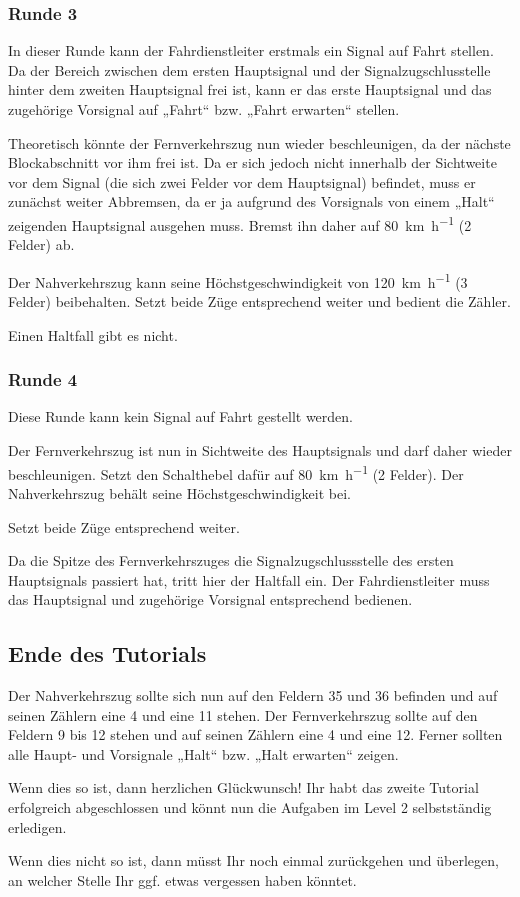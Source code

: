 \subsubsection*{Runde 3}
   In dieser Runde kann der Fahrdienstleiter erstmals ein Signal auf Fahrt stellen. Da der Bereich zwischen dem ersten Hauptsignal und der Signalzugschlusstelle hinter dem zweiten Hauptsignal frei ist, kann er das erste Hauptsignal und das zugehörige Vorsignal auf „Fahrt“ bzw. „Fahrt erwarten“ stellen.

   Theoretisch könnte der Fernverkehrszug nun wieder beschleunigen, da der nächste Blockabschnitt vor ihm frei ist. Da er sich jedoch nicht innerhalb der Sichtweite vor dem Signal (die sich zwei Felder vor dem Hauptsignal) befindet, muss er zunächst weiter Abbremsen, da er ja aufgrund des Vorsignals von einem „Halt“ zeigenden Hauptsignal ausgehen muss. Bremst ihn daher auf \SI{80}{\kilo\metre\per\hour} (2 Felder) ab.

   Der Nahverkehrszug kann seine Höchstgeschwindigkeit von \SI{120}{\kilo\metre\per\hour} (3 Felder) beibehalten. Setzt beide Züge entsprechend weiter und bedient die Zähler.

   Einen Haltfall gibt es nicht.


\subsubsection*{Runde 4}
   Diese Runde kann kein Signal auf Fahrt gestellt werden.

   Der Fernverkehrszug ist nun in Sichtweite des Hauptsignals und darf daher wieder beschleunigen. Setzt den Schalthebel dafür auf \SI{80}{\kilo\metre\per\hour} (2 Felder). Der Nahverkehrszug behält seine Höchstgeschwindigkeit bei.

   Setzt beide Züge entsprechend weiter.

   Da die Spitze des Fernverkehrszuges die Signalzugschlussstelle des ersten Hauptsignals passiert hat, tritt hier der Haltfall ein. Der Fahrdienstleiter muss das Hauptsignal und zugehörige Vorsignal entsprechend bedienen.


\subsection*{Ende des Tutorials}
  Der Nahverkehrszug sollte sich nun auf den Feldern 35 und 36 befinden und auf seinen Zählern eine 4 und eine 11 stehen. Der Fernverkehrszug sollte auf den Feldern 9 bis 12 stehen und auf seinen Zählern eine 4 und eine 12. Ferner sollten alle Haupt- und Vorsignale „Halt“ bzw. „Halt erwarten“ zeigen.
  \begin{framed}\noindent
    Wenn dies so ist, dann herzlichen Glückwunsch! Ihr habt das zweite Tutorial erfolgreich abgeschlossen und könnt nun die Aufgaben im Level 2 selbstständig erledigen.
  \end{framed}
  \begin{framed}\noindent
    Wenn dies nicht so ist, dann müsst Ihr noch einmal zurückgehen und überlegen, an welcher Stelle Ihr ggf. etwas vergessen haben könntet.
  \end{framed}
